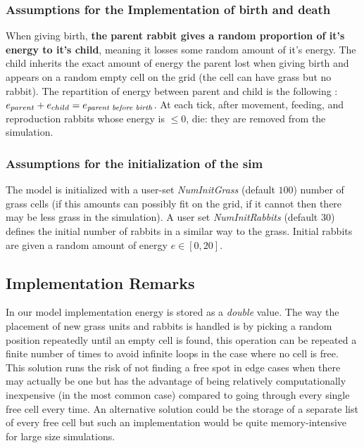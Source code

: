 \documentclass[11pt]{article}
\begin{document}
\subsubsection{Assumptions for the Implementation of birth and death}

When giving birth, \textbf{the parent rabbit gives a random proportion of it's energy to it's child}, meaning it losses some random amount of it's energy. The child inherits the exact amount of energy the parent lost when giving birth and appears on a random empty cell on the grid (the cell can have grass but no rabbit). The repartition of energy between parent and child is the following : $e_{parent} + e_{child} = e_{\text{\textit{parent before birth}}}$. At each tick, after movement, feeding, and reproduction rabbits whose energy is $\leq 0$, die: they are removed from the simulation.

\subsubsection{Assumptions for the initialization of the sim}

The model is initialized with a user-set \textit{NumInitGrass} (default $100$) number of grass cells (if this amounts can possibly fit on the grid, if it cannot then there may be less grass in the simulation). A user set \textit{NumInitRabbits} (default $30$) defines the initial number of rabbits in a similar way to the grass. Initial rabbits are given a random amount of energy $e \in [0,20]$.

\subsection{Implementation Remarks}

In our model implementation energy is stored as a \textit{double} value. The way the placement of new grass units and rabbits is handled is by picking a random position repeatedly until an empty cell is found, this operation can be repeated a finite number of times to avoid infinite loops in the case where no cell is free. This solution runs the risk of not finding a free spot in edge cases when there may actually be one but has the advantage of being relatively computationally inexpensive (in the most common case) compared to going through every single free cell every time. An alternative solution could be the storage of a separate list of every free cell but such an implementation would be quite memory-intensive for large size simulations.
\end{document}
